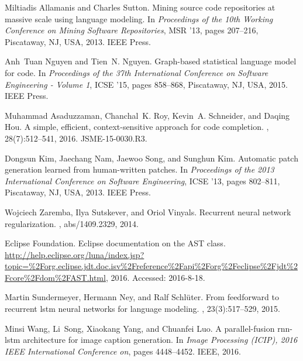 \documentclass[runningheads,a4paper]{llncs}
\begin{document}
\begin{thebibliography}{1}

Miltiadis Allamanis and Charles Sutton.
\newblock Mining source code repositories at massive scale using language
  modeling.
\newblock In {\em Proceedings of the 10th Working Conference on Mining Software
  Repositories}, MSR '13, pages 207--216, Piscataway, NJ, USA, 2013. IEEE
  Press.

Anh~Tuan Nguyen and Tien~N. Nguyen.
\newblock Graph-based statistical language model for code.
\newblock In {\em Proceedings of the 37th International Conference on Software
  Engineering - Volume 1}, ICSE '15, pages 858--868, Piscataway, NJ, USA, 2015.
  IEEE Press.

Muhammad Asaduzzaman, Chanchal~K. Roy, Kevin~A. Schneider, and Daqing Hou.
\newblock A simple, efficient, context-sensitive approach for code completion.
, 28(7):512--541,
  2016.
\newblock JSME-15-0030.R3.

Dongsun Kim, Jaechang Nam, Jaewoo Song, and Sunghun Kim.
\newblock Automatic patch generation learned from human-written patches.
\newblock In {\em Proceedings of the 2013 International Conference on Software
  Engineering}, ICSE '13, pages 802--811, Piscataway, NJ, USA, 2013. IEEE
  Press.

Wojciech Zaremba, Ilya Sutskever, and Oriol Vinyals.
\newblock Recurrent neural network regularization.
, abs/1409.2329, 2014.

Eclipse Foundation.
\newblock Eclipse documentation on the {AST} class.
\newblock
  \url{http://help.eclipse.org/luna/index.jsp?topic=%2Forg.eclipse.jdt.doc.isv%2Freference%2Fapi%2Forg%2Feclipse%2Fjdt%2Fcore%2Fdom%2FAST.html},
  2016.
\newblock Accessed: 2016-8-18.

Martin Sundermeyer, Hermann Ney, and Ralf Schl{\"u}ter.
\newblock From feedforward to recurrent lstm neural networks for language
  modeling.
, 23(3):517--529, 2015.

Minsi Wang, Li~Song, Xiaokang Yang, and Chuanfei Luo.
\newblock A parallel-fusion rnn-lstm architecture for image caption generation.
\newblock In {\em Image Processing (ICIP), 2016 IEEE International Conference
  on}, pages 4448--4452. IEEE, 2016.

\end{thebibliography}
\end{document}
